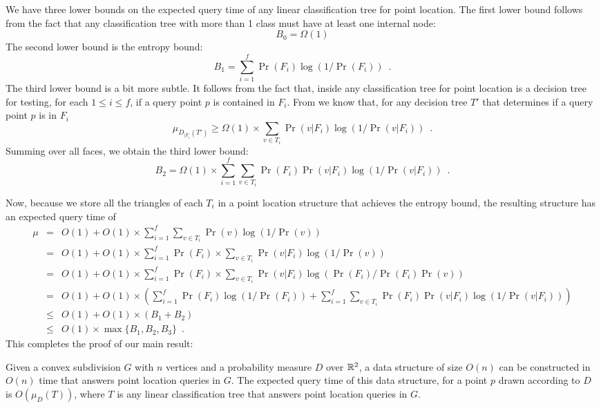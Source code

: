 \documentclass[charterfonts,lotsofwhite]{patmorin}
\begin{document}
We have three lower bounds on the expected query time of any linear
classification tree for point location.  The first lower bound follows
from the fact that any classification tree with more than 1 class must
have at least one internal node:
\[
    B_0 = \Omega(1)
\]
The second lower bound is the
entropy bound:
\[
	B_1 = \sum_{i=1}^f \Pr(F_i)\log(1/\Pr(F_i)) \enspace .
\]
The third lower bound is a bit more subtle.  It follows from the fact
that, inside any classification tree for point location is a decision
tree for testing, for each $1\le i\le f$, if a query point $p$ is
contained in $F_i$.  From  we know that, for any
decision tree $T'$ that determines if a query point $p$ is in $F_i$
\[
   \mu_{D_{|F_i}(T')} \ge \Omega(1)\times \sum_{v\in T_i}\Pr(v|F_i)\log(1/\Pr(v|F_i))
	\enspace .
\]
Summing over all faces, we obtain the third lower bound:
\[
   B_2 = \Omega(1)\times \sum_{i=1}^f \sum_{v\in T_i}\Pr(F_i)\Pr(v|F_i)\log(1/\Pr(v|F_i))
	\enspace .
\]

Now, because we store all the triangles of each $T_i$ in a point
location structure that achieves the entropy bound, the resulting
structure has an expected query time of 
\begin{eqnarray*}
\mu & = & O(1)+O(1)\times \sum_{i=1}^f \sum_{v\in T_i} \Pr(v)\log(1/\Pr(v)) \\
& = & O(1)+O(1)\times\sum_{i=1}^f \Pr(F_i)\times \sum_{v\in T_i} \Pr(v|F_{i})\log(1/\Pr(v)) \\
& = & O(1)+O(1)\times\sum_{i=1}^f \Pr(F_i)\times \sum_{v\in T_i}
	\Pr(v|F_{i})\log(\Pr(F_i)/\Pr(F_i)\Pr(v)) \\
& = & O(1)+O(1)\times\left(\sum_{i=1}^f \Pr(F_i)\log (1/\Pr(F_i)) + 
        \sum_{i=1}^f \sum_{v\in T_i}
	\Pr(F_i)\Pr(v|F_{i})\log(1/\Pr(v|F_i))\right) \\
& \le & O(1)+O(1)\times(B_1 + B_2) \\
& \le & O(1)\times \max\{B_1, B_2,B_3\} \enspace .
\end{eqnarray*}
This completes the proof of our main result:

\begin{thm}
Given a convex subdivision $G$ with $n$ vertices and a probability measure
$D$ over $\mathbb{R}^2$, a data structure of size
$O(n)$ can be constructed in $O(n)$ time that answers point location queries in 
$G$. 
The expected query time of this data structure, for a point $p$
drawn according to $D$ is $O(\mu_D(T))$, where $T$ is any linear
classification tree that answers point location queries in $G$.
\end{thm}
\end{document}
